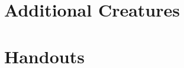 \renewcommand{\headingtype}{APPENDIX}

\chapter{Additional Creatures}
\label{undeadstats}

\begin{multicols}{2}




\end{multicols}

\chapter{Handouts}

